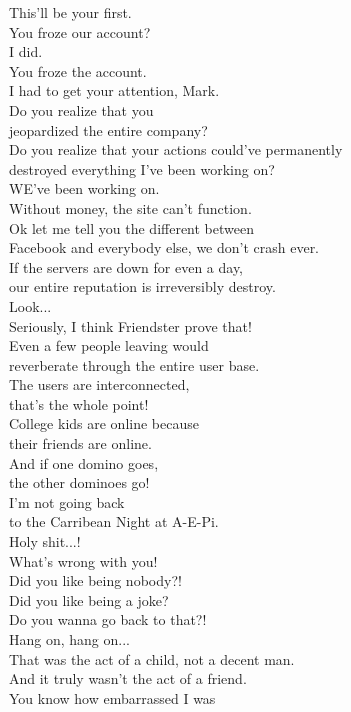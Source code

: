 \documentclass{article}
\begin{document}
\begin{multicols}{3}
This'll be your first.\\
You froze our account?\\
I did.\\
You froze the account.\\
I had to get your attention, Mark.\\
Do you realize that you\\
jeopardized the entire company?\\
Do you realize that your actions could've permanently\\
destroyed everything I've been working on?\\
WE've been working on.\\
Without money, the site can't function.\\
Ok let me tell you the different between\\
Facebook and everybody else, we don't crash ever.\\
If the servers are down for even a day,\\
our entire reputation is irreversibly destroy.\\
Look...\\
Seriously, I think Friendster prove that!\\
Even a few people leaving would\\
reverberate through the entire user base.\\
The users are interconnected,\\
that's the whole point!\\
College kids are online because\\
their friends are online.\\
And if one domino goes,\\
the other dominoes go!\\
I'm not going back\\
to the Carribean Night at A-E-Pi.\\
Holy shit...!\\
What's wrong with you!\\
Did you like being nobody?!\\
Did you like being a joke?\\
Do you wanna go back to that?!\\
Hang on, hang on...\\
That was the act of a child, not a decent man.\\
And it truly wasn't the act of a friend.\\
You know how embarrassed I was\\

\end{multicols}
\end{document}
